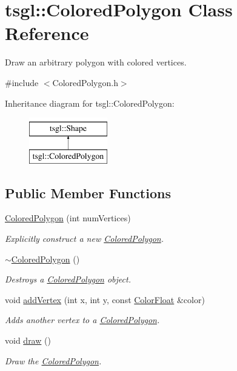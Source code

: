 \hypertarget{classtsgl_1_1_colored_polygon}{}\section{tsgl\+:\+:Colored\+Polygon Class Reference}
\label{classtsgl_1_1_colored_polygon}


Draw an arbitrary polygon with colored vertices.  




{\ttfamily \#include $<$Colored\+Polygon.\+h$>$}

Inheritance diagram for tsgl\+:\+:Colored\+Polygon\+:\begin{figure}[H]
\begin{center}
\leavevmode
\includegraphics[height=2.000000cm]{classtsgl_1_1_colored_polygon}
\end{center}
\end{figure}
\subsection*{Public Member Functions}
\begin{DoxyCompactItemize}
\item 
\hyperlink{classtsgl_1_1_colored_polygon_a027216c5958ce1974d3ef6429ce479c7}{Colored\+Polygon} (int num\+Vertices)
\begin{DoxyCompactList}\small\item\em Explicitly construct a new \hyperlink{classtsgl_1_1_colored_polygon}{Colored\+Polygon}. \end{DoxyCompactList}\item 
\hyperlink{classtsgl_1_1_colored_polygon_a39b294fb52d84445e6c73398cfe9f674}{$\sim$\+Colored\+Polygon} ()
\begin{DoxyCompactList}\small\item\em Destroys a \hyperlink{classtsgl_1_1_colored_polygon}{Colored\+Polygon} object. \end{DoxyCompactList}\item 
void \hyperlink{classtsgl_1_1_colored_polygon_a70c4e2bd5a96623f1d8a1d0206ececed}{add\+Vertex} (int x, int y, const \hyperlink{structtsgl_1_1_color_float}{Color\+Float} \&color)
\begin{DoxyCompactList}\small\item\em Adds another vertex to a \hyperlink{classtsgl_1_1_colored_polygon}{Colored\+Polygon}. \end{DoxyCompactList}\item 
void \hyperlink{classtsgl_1_1_colored_polygon_a6b93c1fa689dbee7592faeda0cf13933}{draw} ()
\begin{DoxyCompactList}\small\item\em Draw the \hyperlink{classtsgl_1_1_colored_polygon}{Colored\+Polygon}. \end{DoxyCompactList}\end{DoxyCompactItemize}
